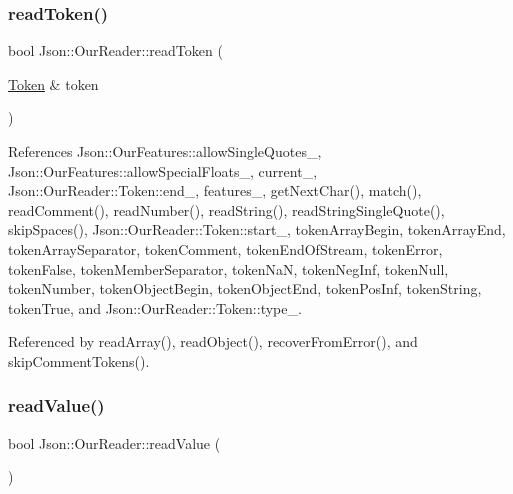 \subsubsection{\texorpdfstring{read\+Token()}{readToken()}}
{\footnotesize\ttfamily bool Json\+::\+Our\+Reader\+::read\+Token (\begin{DoxyParamCaption}\item[{\hyperlink{classJson_1_1OurReader_1_1Token}{Token} \&}]{token }\end{DoxyParamCaption})\hspace{0.3cm}{\ttfamily [private]}}



References Json\+::\+Our\+Features\+::allow\+Single\+Quotes\+\_\+, Json\+::\+Our\+Features\+::allow\+Special\+Floats\+\_\+, current\+\_\+, Json\+::\+Our\+Reader\+::\+Token\+::end\+\_\+, features\+\_\+, get\+Next\+Char(), match(), read\+Comment(), read\+Number(), read\+String(), read\+String\+Single\+Quote(), skip\+Spaces(), Json\+::\+Our\+Reader\+::\+Token\+::start\+\_\+, token\+Array\+Begin, token\+Array\+End, token\+Array\+Separator, token\+Comment, token\+End\+Of\+Stream, token\+Error, token\+False, token\+Member\+Separator, token\+NaN, token\+Neg\+Inf, token\+Null, token\+Number, token\+Object\+Begin, token\+Object\+End, token\+Pos\+Inf, token\+String, token\+True, and Json\+::\+Our\+Reader\+::\+Token\+::type\+\_\+.



Referenced by read\+Array(), read\+Object(), recover\+From\+Error(), and skip\+Comment\+Tokens().

\mbox{\label{classJson_1_1OurReader_a1765d9670d191c89a57a22ea5591d35f_a1765d9670d191c89a57a22ea5591d35f}} 
\subsubsection{\texorpdfstring{read\+Value()}{readValue()}}
{\footnotesize\ttfamily bool Json\+::\+Our\+Reader\+::read\+Value (\begin{DoxyParamCaption}{ }\end{DoxyParamCaption})\hspace{0.3cm}{\ttfamily [private]}}



